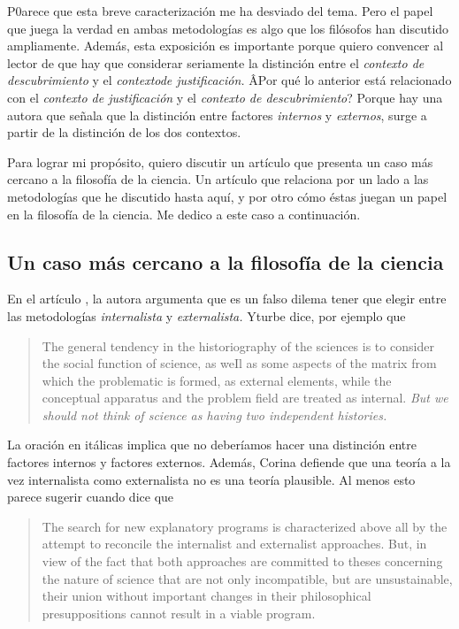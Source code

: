 P0arece que esta breve caracterización me ha desviado del tema. 
Pero el papel que juega la verdad en ambas metodologías es algo que los filósofos han discutido ampliamente. 
Además, esta exposición es importante porque quiero convencer al lector de que hay que considerar seriamente la distinción entre el \emph{contexto de descubrimiento} y el \emph{contextode justificación.} ÂPor qué lo anterior está relacionado con el \emph{contexto de justificación} y el \emph{contexto de descubrimiento}?
Porque hay una autora que señala que la distinción entre factores
\emph{internos} y \emph{externos}, surge a partir de la distinción de los
dos contextos.

Para lograr mi propósito, quiero discutir un artículo que presenta un caso más cercano a la filosofía de la ciencia.
Un artículo que relaciona por un lado a las metodologías que he discutido hasta aquí, y por otro cómo éstas juegan un papel en la filosofía de la ciencia.
Me dedico a este caso a continuación.

\subsection{Un caso más cercano a la filosofía de la ciencia}\label{sbc:yturbe}

\noindent En el artículo , la autora argumenta que es un falso dilema tener que elegir entre las metodologías \emph{internalista} y \emph{externalista.}
Yturbe dice, por ejemplo que

\begin{quote}
	The general tendency in the historiography of the sciences is to consider the social function of science, as weIl as some aspects of the matrix from which the problematic is formed, as external elements, while the conceptual apparatus and the problem field are treated as internal. \emph{But we should not think of science as having two independent histories.} \parencite[p.85, énfasis agregado]{Yturbe1995}
\end{quote}

La oración en itálicas implica que no deberíamos hacer una distinción entre factores internos y factores externos.
Además, Corina defiende que una teoría a la vez internalista como externalista no es una teoría plausible.
Al menos esto parece sugerir cuando dice que

\begin{quote}
	
	The search for new explanatory programs is characterized above all by the attempt to reconcile the internalist and externalist approaches.
	But, in view of the fact that both approaches are committed to theses concerning the nature of science that are not only incompatible, but are unsustainable, their union without important changes in their philosophical presuppositions cannot result in a viable program. \parencite[p. 79]{Yturbe1995}

\end{quote}

